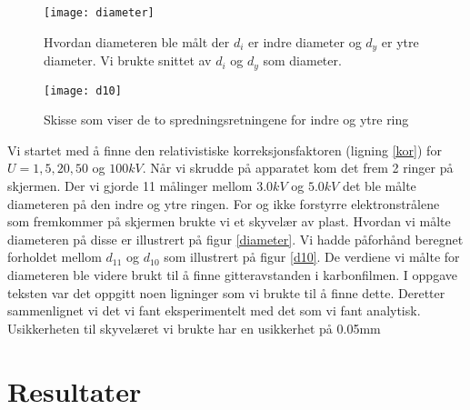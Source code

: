 \documentclass[norsk,a4paper,12pt]{article}
\begin{document}
\begin{figure}
	\begin{minipage}{0.5\linewidth}
  	\texttt{[image: diameter]}
	\caption[Skisse av hvordan diameteren ble målt]{Hvordan diameteren ble målt der $d_i$ er indre diameter og $d_y$ er ytre diameter. Vi brukte snittet av $d_i$ og $d_y$ som diameter.}
	\label{diameter}
	\end{minipage}
	\hspace{0.5cm}
	\begin{minipage}{0.5\linewidth}
	\texttt{[image: d10]}
	\caption{Skisse som viser de to spredningsretningene for indre og ytre ring}
	\label{d10}
	\end{minipage}
\end{figure}


Vi startet med å finne den relativistiske korreksjonsfaktoren (ligning \ref{kor}) for $U =1,5,20,50$ og $100 kV$. Når vi skrudde på apparatet kom det frem 2 ringer på skjermen. Der vi gjorde 11 målinger mellom $3.0kV$ og $5.0 kV$ det ble målte diameteren på den indre og ytre ringen. For og ikke forstyrre elektronstrålene som fremkommer på skjermen brukte vi et skyvelær av plast. Hvordan vi målte diameteren på disse er illustrert på figur \vref{diameter}. Vi hadde påforhånd beregnet forholdet mellom $d_{11}$ og $d_{10}$ som illustrert på figur \vref{d10}. De verdiene vi målte for diameteren ble videre brukt til å finne gitteravstanden i karbonfilmen. I oppgave teksten \cite{opg} var det oppgitt noen ligninger som vi brukte til å finne dette. Deretter sammenlignet vi det vi fant eksperimentelt med det som vi fant analytisk.
Usikkerheten til skyvelæret vi brukte har en usikkerhet på 0.05mm

\section{Resultater}
\end{document}
